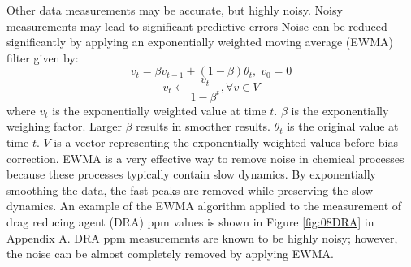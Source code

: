 Other data measurements may be accurate, but highly noisy. Noisy measurements may lead to significant predictive errors 
Noise can be reduced significantly by applying an exponentially weighted moving average (EWMA) filter given by:
\begin{equation}
    v_t = \beta v_{t - 1} + (1 - \beta) \theta_t, \; v_0 = 0
    \label{eq:08EWMA}
\end{equation}
\begin{equation}
    v_t \leftarrow \frac{v_t}{1 - \beta^t}, \forall v \in V
    \label{eq:08Bias_Correction}
\end{equation}
where $v_{t}$ is the exponentially weighted value at time $t$.  $\beta$ is the exponentially weighing factor.  Larger $\beta$ results in smoother results.  $\theta_t$ is the original value at time $t$. $V$ is a vector representing the exponentially weighted values before bias correction. EWMA is a very effective way to remove noise in chemical processes because these processes typically contain slow dynamics. By exponentially smoothing the data, the fast peaks are removed while preserving the slow dynamics. An example of the EWMA algorithm applied to the measurement of drag reducing agent (DRA) ppm values is shown in Figure \ref{fig:08DRA} in Appendix A.  DRA ppm measurements are known to be highly noisy; however, the noise can be almost completely removed by applying EWMA.

